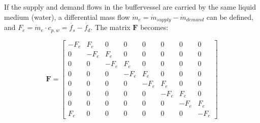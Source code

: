 \begin{scriptsize}
	If the supply and demand flows in the buffervessel are carried by the same liquid medium (water), a differential mass flow $\dot{m}_e = \dot{m}_{supply} - \dot{m}_{demand}$ can be defined, and 
	$ F_e = \dot{m}_{e} \cdot c_{p, w} = \dot{f_s}-\dot{f_d}$. The matrix $\mathbf{F}$ becomes:
	
	\begin{equation}
		\mathbf{F} =  
		\begin{bmatrix}
			-F_e & F_e & 0 & 0 & 0 & 0 & 0 & 0 \\
			0 & -F_e & F_e & 0 & 0 & 0 & 0 & 0 \\
			0 & 0 & -F_e & F_e & 0 & 0 & 0 & 0 \\
			0 & 0 & 0 & -F_e & F_e & 0 & 0 & 0 \\
			0 & 0 & 0 & 0 & -F_e & F_e & 0 & 0 \\
			0 & 0 & 0 & 0 & 0 & -F_e & F_e & 0 \\
			0 & 0 & 0 & 0 & 0 & 0 & -F_e & F_e \\
			F_e & 0 & 0 & 0 & 0 & 0 & 0 & -F_e
		\end{bmatrix}
		\label{eq:flowmatrix}
	\end{equation}
	
\end{scriptsize}

\newpage